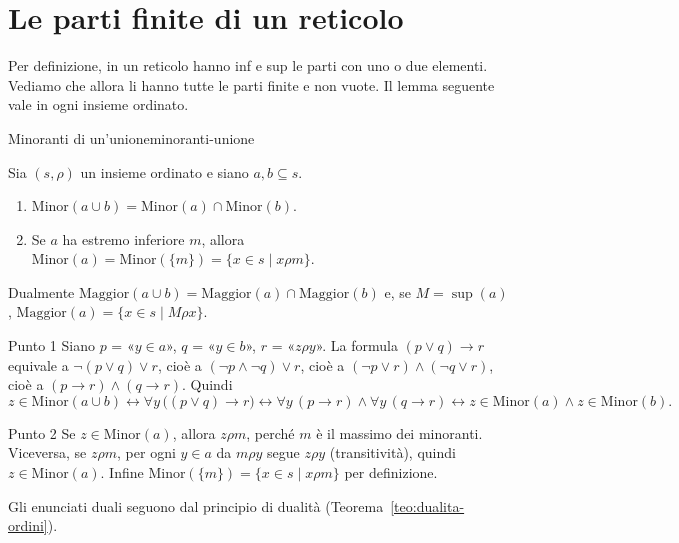 \section{Le parti finite di un reticolo}\label{sec:parti-finite-reticoli}

Per definizione, in un reticolo hanno inf e sup le parti con uno o due elementi. Vediamo che allora li hanno tutte le parti finite e non
vuote. Il lemma seguente vale in ogni insieme ordinato.

\begin{concetto}
\begin{Lemma}{Minoranti di un'unione}{minoranti-unione}
    \begin{prerequisiti}
    \end{prerequisiti}
    Sia $(s, \rho)$ un insieme ordinato e siano $a, b \subseteq s$.
    \begin{enumerate}
        \item $\mathrm{Minor}(a \cup b) = \mathrm{Minor}(a) \cap \mathrm{Minor}(b)$.
        \item Se $a$ ha estremo inferiore $m$, allora $\mathrm{Minor}(a) = \mathrm{Minor}(\{m\}) = \{x \in s \mid x \rho m\}$.
    \end{enumerate}
    Dualmente $\mathrm{Maggior}(a \cup b) = \mathrm{Maggior}(a) \cap \mathrm{Maggior}(b)$ e, se $M = \sup(a)$, $\mathrm{Maggior}(a) = \{x \in s \mid M \rho x\}$.
\end{Lemma}
\begin{dimostrazione}
    \begin{caso}{Punto 1}
        Siano $p$ = «$y \in a$», $q$ = «$y \in b$», $r$ = «$z \rho y$». La formula $(p \vee q) \rightarrow r$ equivale a $\neg(p \vee q) \vee r$, cioè a
        $(\neg p \wedge \neg q) \vee r$, cioè a $(\neg p \vee r) \wedge (\neg q \vee r)$, cioè a $(p \rightarrow r) \wedge (q \rightarrow r)$. Quindi
        \[ z \in \mathrm{Minor}(a \cup b) \leftrightarrow \forall y\,\big((p \vee q) \rightarrow r\big) \leftrightarrow \forall y\,(p \rightarrow r) \wedge \forall y\,(q \rightarrow r)
           \leftrightarrow z \in \mathrm{Minor}(a) \wedge z \in \mathrm{Minor}(b). \]
    \end{caso}
    \begin{caso}{Punto 2}
        Se $z \in \mathrm{Minor}(a)$, allora $z \rho m$, perché $m$ è il massimo dei minoranti. Viceversa, se $z \rho m$, per ogni $y \in a$ da $m \rho y$ segue
        $z \rho y$ (transitività), quindi $z \in \mathrm{Minor}(a)$. Infine $\mathrm{Minor}(\{m\}) = \{x \in s \mid x \rho m\}$ per definizione.
    \end{caso}
    Gli enunciati duali seguono dal principio di dualità (Teorema~\ref{teo:dualita-ordini}).
\end{dimostrazione}
\end{concetto}

